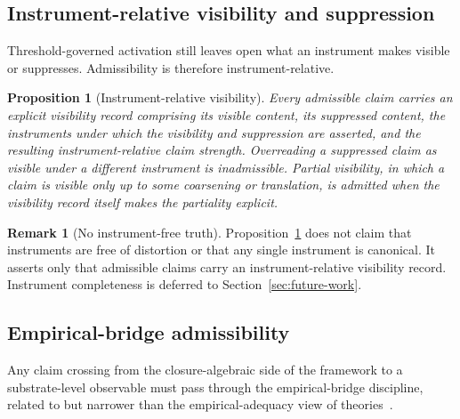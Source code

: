 \documentclass[11pt]{article}
\newtheorem{proposition}[theorem]{Proposition}
\theoremstyle{definition}
\newtheorem{remark}[theorem]{Remark}
\begin{document}
\subsection{Instrument-relative visibility and suppression}\label{subsec:visibility-suppression}

Threshold-governed activation still leaves open what an instrument
makes visible or suppresses. Admissibility is therefore
instrument-relative.

\begin{proposition}[Instrument-relative visibility]\label{prop:visibility}
Every admissible claim carries an explicit visibility record comprising
its visible content, its suppressed content, the instruments under which
the visibility and suppression are asserted, and the resulting
instrument-relative claim strength. Overreading a suppressed claim as
visible under a different instrument is inadmissible. Partial visibility,
in which a claim is visible only up to some coarsening or translation, is
admitted when the visibility record itself makes the partiality explicit.
\end{proposition}

\begin{remark}[No instrument-free truth]\label{rem:no-instrument-free}
Proposition~\ref{prop:visibility} does not claim that instruments are
free of distortion or that any single instrument is canonical. It
asserts only that admissible claims carry an instrument-relative
visibility record. Instrument completeness is deferred to
Section~\ref{sec:future-work}.
\end{remark}

\subsection{Empirical-bridge admissibility}\label{subsec:empirical-bridge}

Any claim crossing from the closure-algebraic side of the framework
to a substrate-level observable must pass through the
empirical-bridge discipline, related to but narrower than
the empirical-adequacy view of theories~\citep{vanFraassen1980}.
\end{document}
